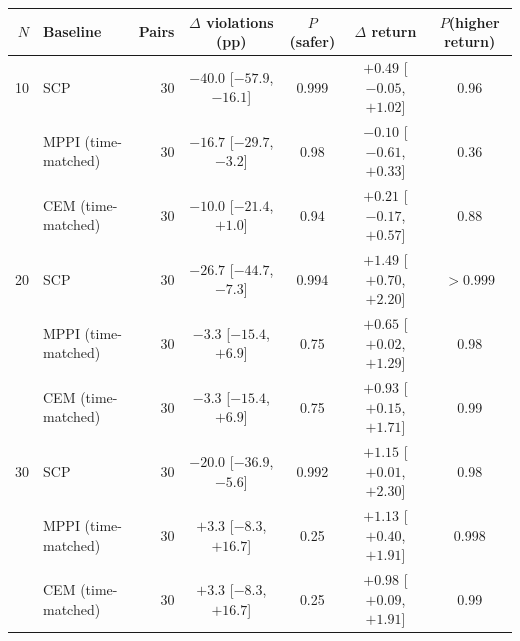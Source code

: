 \begin{tabular}{@{}rlrcccc@{}}
\toprule
$N$ & Baseline & Pairs & $\Delta$ violations (pp) & $P$(safer) & $\Delta$ return & $P$(higher return) \\
\midrule
10 & SCP & 30 & $-40.0$ [$-57.9$, $-16.1$] & 0.999 & $+0.49$ [$-0.05$, $+1.02$] & 0.96 \\
 & MPPI (time-matched) & 30 & $-16.7$ [$-29.7$, $-3.2$] & 0.98 & $-0.10$ [$-0.61$, $+0.33$] & 0.36 \\
 & CEM (time-matched) & 30 & $-10.0$ [$-21.4$, $+1.0$] & 0.94 & $+0.21$ [$-0.17$, $+0.57$] & 0.88 \\
\midrule
20 & SCP & 30 & $-26.7$ [$-44.7$, $-7.3$] & 0.994 & $+1.49$ [$+0.70$, $+2.20$] & $>0.999$ \\
 & MPPI (time-matched) & 30 & $-3.3$ [$-15.4$, $+6.9$] & 0.75 & $+0.65$ [$+0.02$, $+1.29$] & 0.98 \\
 & CEM (time-matched) & 30 & $-3.3$ [$-15.4$, $+6.9$] & 0.75 & $+0.93$ [$+0.15$, $+1.71$] & 0.99 \\
\midrule
30 & SCP & 30 & $-20.0$ [$-36.9$, $-5.6$] & 0.992 & $+1.15$ [$+0.01$, $+2.30$] & 0.98 \\
 & MPPI (time-matched) & 30 & $+3.3$ [$-8.3$, $+16.7$] & 0.25 & $+1.13$ [$+0.40$, $+1.91$] & 0.998 \\
 & CEM (time-matched) & 30 & $+3.3$ [$-8.3$, $+16.7$] & 0.25 & $+0.98$ [$+0.09$, $+1.91$] & 0.99 \\
\bottomrule
\end{tabular}
